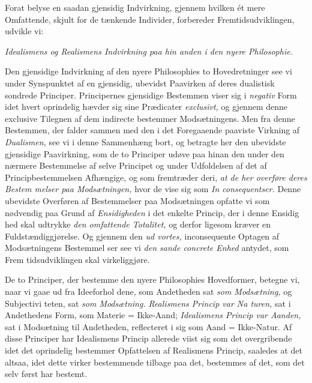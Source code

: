Forat belyse en saadan gjensidig Indvirkning, gjennem
hvilken ét mere Omfattende, skjult for de tænkende Individer,
forbereder Fremtidsudviklingen, udvikle vi:

\emph{Idealismens og Realismens Indvirkning paa hin\-%
anden i den nyere Philosophie.}

Den gjensidige Indvirkning af den nyere Philosophies to
Hovedretninger see vi under Synspunktet af en gjensidig,
ubevidst Paavirken af deres dualistisk sondrede Principer.
Principernes gjensidige Bestemmen viser sig i \emph{negativ} Form
idet hvert oprindelig hævder sig sine Prædicater \emph{exclusivt,} og
gjennem denne exclusive Tilegnen af dem indirecte bestemmer
Modsætningens. Men fra denne Bestemmen, der falder sammen
med den i det Foregaaende paaviste Virkning af \emph{Dualismen,}
see vi i denne Sammenhæng bort, og betragte her den ubevidste
gjensidige Paavirkning, som de to Principer udøve paa hinan\-%
den under den nærmere Bestemmelse af selve Principet og
under Udfoldelsen af det af Principbestemmelsen Afhængige, og
som fremtræder deri, \emph{at de her overføre deres Bestem\-%
melser paa Modsætningen,} hvor de vise sig som \emph{In\-%
consequentser.} Denne ubevidste Overføren af Bestemmelser
paa Modsætningen opfatte vi som nødvendig paa Grund af
\emph{Ensidigheden} i det enkelte Princip, der i denne Ensidig\-%
hed skal udtrykke \emph{den omfattende Totalitet,} og derfor
ligesom kræver en Fuldstændiggjørelse. Og gjennem den \emph{ud\-%
vortes,} inconsequente Optagen af Modsætningens Bestemmel\-%
ser see vi \emph{den sande concrete Enhed} antydet, som Frem\-%
tidsudviklingen skal virkeliggjøre.

De to Principer, der bestemme den nyere Philosophies
Hovedformer, betegne vi, naar vi gaae ud fra Ideeforhol\-%
dene, som Andetheden sat \emph{som Modsætning,} og Subjectivi\-%
teten, sat \emph{som Modsætning.} \emph{Realismens Princip var Na\-%
turen,} sat i Andethedens Form, som Materie = Ikke-Aand;
\emph{Idealismens Princip var Aanden,} sat i Modsætning til
Andetheden, reflecteret i sig som Aand = Ikke-Natur. Af
disse Principer har Idealismens Princip allerede viist sig som
det overgribende idet det oprindelig bestemmer Opfattelsen af
Realismens Princip, saaledes at det altsaa, idet dette virker
bestemmende tilbage paa det, bestemmes af det, som det selv
først har bestemt.

